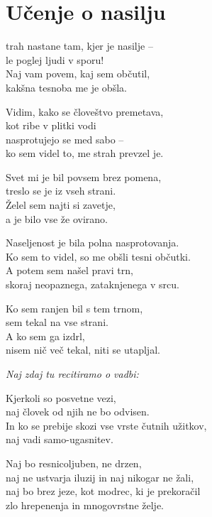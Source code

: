 \cleartorecto
{}
\chapter{Učenje o nasilju}

trah nastane tam, kjer je nasilje --\\
le poglej ljudi v sporu!\\
Naj vam povem, kaj sem občutil,\\
kakšna tesnoba me je obšla.

Vidim, kako se človeštvo premetava,\\
kot ribe v plitki vodi\\
nasprotujejo se med sabo --\\
ko sem videl to, me strah prevzel je.

Svet mi je bil povsem brez pomena,\\
treslo se je iz vseh strani.\\
Želel sem najti si zavetje,\\
a je bilo vse že ovirano.

Naseljenost je bila polna nasprotovanja.\\
Ko sem to videl, so me obšli tesni občutki.\\
A potem sem našel pravi trn,\\
skoraj neopaznega, zataknjenega v srcu.

\clearpage

Ko sem ranjen bil s tem trnom,\\
sem tekal na vse strani.\\
A ko sem ga izdrl,\\
nisem nič več tekal, niti se utapljal.

\emph{Naj zdaj tu recitiramo o vadbi:}

Kjerkoli so posvetne vezi,\\
naj človek od njih ne bo odvisen.\\
In ko se prebije skozi vse vrste čutnih užitkov,\\
naj vadi samo-ugasnitev.

Naj bo resnicoljuben, ne drzen,\\
naj ne ustvarja iluzij in naj nikogar ne žali,\\
naj bo brez jeze, kot modrec, ki je prekoračil\\
zlo hrepenenja in mnogovrstne želje.

